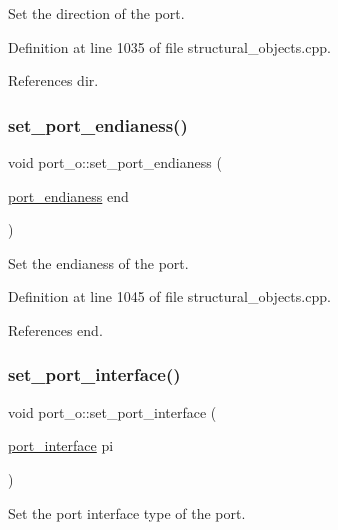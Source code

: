 Set the direction of the port. 



Definition at line 1035 of file structural\+\_\+objects.\+cpp.



References dir.

\mbox{\label{structport__o_a1aa10dc8e4f34e44ecd95711d0ed6e56}} 
\subsubsection{\texorpdfstring{set\+\_\+port\+\_\+endianess()}{set\_port\_endianess()}}
{\footnotesize\ttfamily void port\+\_\+o\+::set\+\_\+port\+\_\+endianess (\begin{DoxyParamCaption}\item[{\hyperlink{structport__o_a7f16c53245215df0064e1b8ef27a36e3}{port\+\_\+endianess}}]{end }\end{DoxyParamCaption})}



Set the endianess of the port. 



Definition at line 1045 of file structural\+\_\+objects.\+cpp.



References end.

\mbox{\label{structport__o_abb03bbce9d78f79d17dbc64d9f8fc2f2}} 
\subsubsection{\texorpdfstring{set\+\_\+port\+\_\+interface()}{set\_port\_interface()}}
{\footnotesize\ttfamily void port\+\_\+o\+::set\+\_\+port\+\_\+interface (\begin{DoxyParamCaption}\item[{\hyperlink{structport__o_a37d2e6a450aea997028478f5bfb4e1f6}{port\+\_\+interface}}]{pi }\end{DoxyParamCaption})}



Set the port interface type of the port. 



